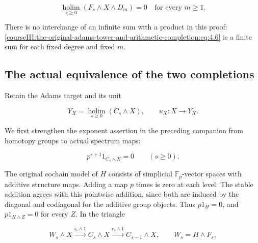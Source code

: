 \begin{equation}
\operatorname*{holim}_{s\geq0}(F_s\wedge X\wedge D_m)=0
\quad\text{for every }m\geq1.
\label{courseIII:the-original-adams-tower-and-arithmetic-completion:eq:4.9}
\end{equation}

There is no interchange of an infinite sum with a product in this proof: \eqref{courseIII:the-original-adams-tower-and-arithmetic-completion:eq:4.6} is a finite sum for each fixed degree and fixed \(m\).

\subsection{The actual equivalence of the two completions}
\label{courseIII:the-original-adams-tower-and-arithmetic-completion:arithmetic-adams-equivalence}

\label{courseIII:the-original-adams-tower-and-arithmetic-completion:section-5}\label{courseIII:adams-arithmetic:5}

Retain the Adams target and its unit

\begin{equation}
Y_X=\operatorname*{holim}_{s\geq0}(C_s\wedge X),
\qquad u_X:X\longrightarrow Y_X.
\label{courseIII:the-original-adams-tower-and-arithmetic-completion:eq:5.1}
\end{equation}

We first strengthen the exponent assertion in the preceding companion from homotopy groups to actual spectrum maps:

\begin{equation}
p^{s+1}1_{C_s\wedge X}=0\qquad(s\geq0).
\label{courseIII:the-original-adams-tower-and-arithmetic-completion:eq:5.2}
\end{equation}

The original cochain model of \(H\) consists of simplicial \(\mathbb F_p\)-vector spaces with additive structure maps. Adding a map \(p\) times is zero at each level. The stable addition agrees with this pointwise addition, since both are induced by the diagonal and codiagonal for the additive group objects. Thus \(p1_H=0\), and \(p1_{H\wedge Z}=0\) for every \(Z\). In the triangle

\begin{equation}
W_s\wedge X\xrightarrow{i_s\wedge1}C_s\wedge X
\xrightarrow{r_s\wedge1}C_{s-1}\wedge X,
\qquad W_s=H\wedge F_s,
\label{courseIII:the-original-adams-tower-and-arithmetic-completion:eq:5.3}
\end{equation}

